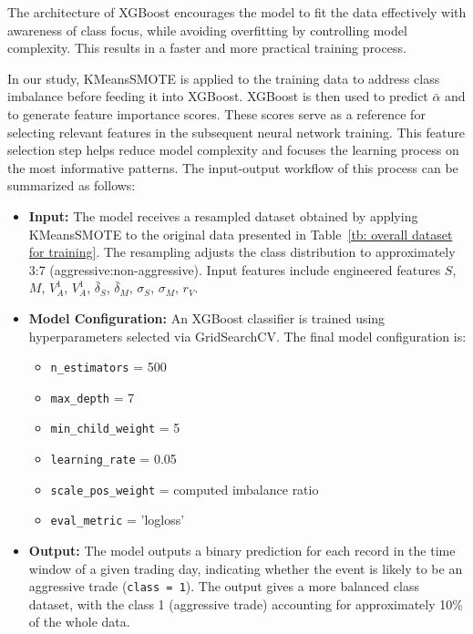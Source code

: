 The architecture of XGBoost encourages the model to fit the data effectively with awareness of class focus, while avoiding overfitting by controlling model complexity. This results in a faster and more practical training process.

In our study, KMeansSMOTE is applied to the training data to address class imbalance before feeding it into XGBoost. XGBoost is then used to predict $\bar{\alpha}$ and to generate feature importance scores. These scores serve as a reference for selecting relevant features in the subsequent neural network training. This feature selection step helps reduce model complexity and focuses the learning process on the most informative patterns. The input-output workflow of this process can be summarized as follows:
\begin{itemize}
  \item \textbf{Input:}  
  The model receives a resampled dataset obtained by applying KMeansSMOTE to the original data presented in Table~\ref{tb: overall dataset for training}. The resampling adjusts the class distribution to approximately 3:7 (aggressive:non-aggressive). Input features include engineered features $S$, $M$, $V_A^{1}$, $V_A^{1}$, $\bar{\delta}_S$, $\bar{\delta}_M$, $\sigma_S$, $\sigma_M$, $r_V$.

  \item \textbf{Model Configuration:}  
  An XGBoost classifier is trained using hyperparameters selected via GridSearchCV. The final model configuration is:
  \begin{itemize}
    \item \texttt{n\_estimators} = 500
    \item \texttt{max\_depth} = 7
    \item \texttt{min\_child\_weight} = 5
    \item \texttt{learning\_rate} = 0.05
    \item \texttt{scale\_pos\_weight} = computed imbalance ratio
    \item \texttt{eval\_metric} = 'logloss'
  \end{itemize}

  \item \textbf{Output:}  
  The model outputs a binary prediction for each record in the time window of a given trading day, indicating whether the event is likely to be an aggressive trade (\texttt{class = 1}). The output gives a more balanced class dataset, with the class 1 (aggressive trade) accounting for approximately 10\% of the whole data.

\end{itemize}



